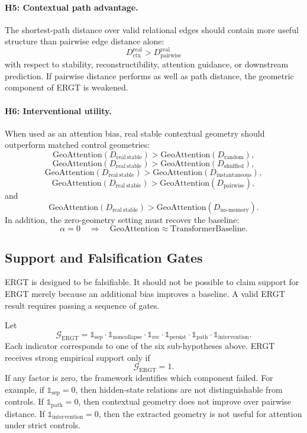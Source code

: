 \documentclass[11pt]{article}
\begin{document}
\paragraph{H5: Contextual path advantage.}
The shortest-path distance over valid relational edges should contain more useful structure than pairwise edge distance alone:
\[
D_{\mathrm{ctx}}^{\mathrm{real}}
>
D_{\mathrm{pairwise}}^{\mathrm{real}}
\]
with respect to stability, reconstructibility, attention guidance, or downstream prediction. If pairwise distance performs as well as path distance, the geometric component of ERGT is weakened.

\paragraph{H6: Interventional utility.}
When used as an attention bias, real stable contextual geometry should outperform matched control geometries:
\[
\mathrm{GeoAttention}(D_{\mathrm{real\ stable}})
>
\mathrm{GeoAttention}(D_{\mathrm{random}}),
\]
\[
\mathrm{GeoAttention}(D_{\mathrm{real\ stable}})
>
\mathrm{GeoAttention}(D_{\mathrm{shuffled}}),
\]
\[
\mathrm{GeoAttention}(D_{\mathrm{real\ stable}})
>
\mathrm{GeoAttention}(D_{\mathrm{instantaneous}}),
\]
\[
\mathrm{GeoAttention}(D_{\mathrm{real\ stable}})
>
\mathrm{GeoAttention}(D_{\mathrm{pairwise}}),
\]
and
\[
\mathrm{GeoAttention}(D_{\mathrm{real\ stable}})
>
\mathrm{GeoAttention}(D_{\mathrm{no\text{-}memory}}).
\]
In addition, the zero-geometry setting must recover the baseline:
\[
\alpha=0
\quad\Rightarrow\quad
\mathrm{GeoAttention}\approx\mathrm{TransformerBaseline}.
\]

\subsection{Support and Falsification Gates}

ERGT is designed to be falsifiable. It should not be possible to claim support for ERGT merely because an additional bias improves a baseline. A valid ERGT result requires passing a sequence of gates.

Let
\[
\mathcal{G}_{\mathrm{ERGT}}
=
\mathbb{1}_{\mathrm{sep}}
\cdot
\mathbb{1}_{\mathrm{noncollapse}}
\cdot
\mathbb{1}_{\mathrm{rec}}
\cdot
\mathbb{1}_{\mathrm{persist}}
\cdot
\mathbb{1}_{\mathrm{path}}
\cdot
\mathbb{1}_{\mathrm{intervention}}.
\]
Each indicator corresponds to one of the six sub-hypotheses above. ERGT receives strong empirical support only if
\[
\mathcal{G}_{\mathrm{ERGT}}=1.
\]
If any factor is zero, the framework identifies which component failed. For example, if $\mathbb{1}_{\mathrm{sep}}=0$, then hidden-state relations are not distinguishable from controls. If $\mathbb{1}_{\mathrm{path}}=0$, then contextual geometry does not improve over pairwise distance. If $\mathbb{1}_{\mathrm{intervention}}=0$, then the extracted geometry is not useful for attention under strict controls.
\end{document}
